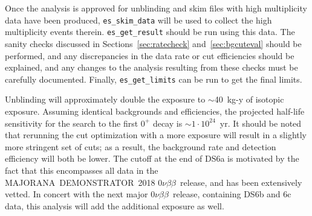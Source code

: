 \documentclass[notitlepage,rmp,aps,10pt]{revtex4-1}
\newcommand{\MJ}{M{\footnotesize AJORANA}}
\newcommand{\Demo}{D{\footnotesize EMON\-STRAT\-OR}}
\newcommand{\MJD}{\MJ\ \Demo}
\newcommand{\znbb}{${0 \nu \beta \beta}$}
\begin{document}
Once the analysis is approved for unblinding and skim files with high multiplicity data have been produced, \texttt{es\_skim\_data} will be used to collect the high multiplicity events therein.
\texttt{es\_get\_result} should be run using this data.
The sanity checks discussed in Sections~\ref{sec:ratecheck} and~\ref{sec:bgcuteval} should be performed, and any discrepancies in the data rate or cut efficiencies should be explained, and any changes to the analysis resulting from these checks must be carefully documented.
Finally, \texttt{es\_get\_limits} can be run to get the final limits.

Unblinding will approximately double the exposure to $\sim$40~kg-y of isotopic exposure. Assuming identical backgrounds and efficiencies, the projected half-life sensitivity for the search to the first $0^+$ decay is $\sim1\cdot10^{24}$~yr. It should be noted that rerunning the cut optimization with a more exposure will result in a slightly more stringent set of cuts; as a result, the background rate and detection efficiency will both be lower.
The cutoff at the end of DS6a is motivated by the fact that this encompasses all data in the \MJD\ 2018 \znbb\ release, and has been extensively vetted.
In concert with the next major \znbb\ release, containing DS6b and 6c data, this analysis will add the additional exposure as well.



\end{document}
